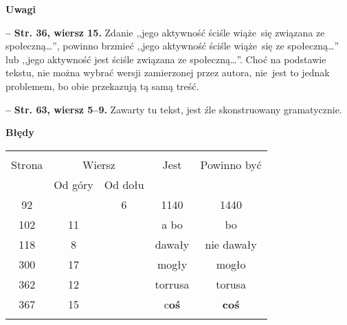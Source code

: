 \documentclass[a4paper]{article}
\newcommand{\spaceOne}{2em}
\newcommand{\tb}{\textbf}
\newcommand{\noi}{\noindent}
\newcommand{\start}{\noi \tb{--} {}}
\newcommand{\StrWg}[2]{\tb{Str. #1, wiersz #2.}}
\newcommand{\Center}[1]{\begin{center} #1 \end{center}}
\newcommand{\CenterTB}[1]{\Center{\tb{#1}}}
\newcommand{\Work}[1]{ \begin{center} {\large \tb{#1}} \end{center} }
\begin{document}
\CenterTB{Uwagi}

\start \StrWg{36}{15} Zdanie ,,jego aktywność ściśle wiąże~się
związana ze społeczną\ldots'', powinno brzmieć ,,jego aktywność ściśle
wiąże~się ze społeczną\ldots'' lub ,,jego aktywność jest ściśle
związana ze społeczną\ldots''. Choć na podstawie tekstu, nie można
wybrać wersji zamierzonej przez autora, nie~jest to jednak problemem,
bo obie przekazują tą samą treść.

\start \StrWg{63}{5--9} Zawarty tu tekst, jest źle skonstruowany
gramatycznie.

\CenterTB{Błędy}
\begin{center}
  \begin{tabular}{|c|c|c|c|c|}
    \hline
    & \multicolumn{2}{c|}{} & & \\
    Strona & \multicolumn{2}{c|}{Wiersz}& Jest & Powinno być \\ \cline{2-3}
    & Od góry & Od dołu &  &  \\ \hline
    92 & & 6 & 1140 & 1440 \\
    102 & 11 & & a bo & bo \\
    118 & 8 & & dawały & nie dawały \\
    300 & 17 & & mogły & mogło \\
    362 & 12 & & torrusa & torusa \\
    367 & 15 & & c\tb{oś} & \tb{coś} \\
    & & & & \\ \hline
  \end{tabular}
\end{center}

\vspace{\spaceOne}







\end{document}

